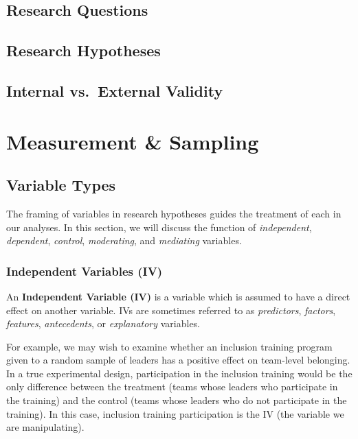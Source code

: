 \documentclass[]{book}
\begin{document}
\hypertarget{research-questions}{%
\section{Research Questions}\label{research-questions}}

\hypertarget{research-hypotheses}{%
\section{Research Hypotheses}\label{research-hypotheses}}

\hypertarget{internal-vs.external-validity}{%
\section{Internal vs.~External Validity}\label{internal-vs.external-validity}}

\hypertarget{measure-sampl}{%
\chapter{Measurement \& Sampling}\label{measure-sampl}}

\hypertarget{variable-types}{%
\section{Variable Types}\label{variable-types}}

The framing of variables in research hypotheses guides the treatment of each in our analyses. In this section, we will discuss the function of \emph{independent}, \emph{dependent}, \emph{control}, \emph{moderating}, and \emph{mediating} variables.

\hypertarget{independent-variables-iv}{%
\subsection{Independent Variables (IV)}\label{independent-variables-iv}}

An \textbf{Independent Variable (IV)} is a variable which is assumed to have a direct effect on another variable. IVs are sometimes referred to as \emph{predictors}, \emph{factors}, \emph{features}, \emph{antecedents}, or \emph{explanatory} variables.

For example, we may wish to examine whether an inclusion training program given to a random sample of leaders has a positive effect on team-level belonging. In a true experimental design, participation in the inclusion training would be the only difference between the treatment (teams whose leaders who participate in the training) and the control (teams whose leaders who do not participate in the training). In this case, inclusion training participation is the IV (the variable we are manipulating).
\end{document}
